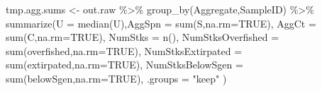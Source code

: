 \documentclass[french,11pt]{book}
\newenvironment{Shaded}{\begin{snugshade}}{\end{snugshade}}
\newcommand{\AttributeTok}[1]{\textcolor[rgb]{0.77,0.63,0.00}{#1}}
\newcommand{\ConstantTok}[1]{\textcolor[rgb]{0.00,0.00,0.00}{#1}}
\newcommand{\FunctionTok}[1]{\textcolor[rgb]{0.00,0.00,0.00}{#1}}
\newcommand{\NormalTok}[1]{#1}
\newcommand{\OtherTok}[1]{\textcolor[rgb]{0.56,0.35,0.01}{#1}}
\newcommand{\SpecialCharTok}[1]{\textcolor[rgb]{0.00,0.00,0.00}{#1}}
\newcommand{\StringTok}[1]{\textcolor[rgb]{0.31,0.60,0.02}{#1}}
\begin{document}
\begin{Shaded}
\begin{Highlighting}[]
\NormalTok{  tmp.agg.sums }\OtherTok{\textless{}{-}}\NormalTok{ out.raw }\SpecialCharTok{\%\textgreater{}\%} \FunctionTok{group\_by}\NormalTok{(Aggregate,SampleID) }\SpecialCharTok{\%\textgreater{}\%}
    \FunctionTok{summarize}\NormalTok{(}\AttributeTok{U =} \FunctionTok{median}\NormalTok{(U),}\AttributeTok{AggSpn =} \FunctionTok{sum}\NormalTok{(S,}\AttributeTok{na.rm=}\ConstantTok{TRUE}\NormalTok{), }
              \AttributeTok{AggCt =} \FunctionTok{sum}\NormalTok{(C,}\AttributeTok{na.rm=}\ConstantTok{TRUE}\NormalTok{),}
              \AttributeTok{NumStks =} \FunctionTok{n}\NormalTok{(),}
              \AttributeTok{NumStksOverfished =} \FunctionTok{sum}\NormalTok{(overfished,}\AttributeTok{na.rm=}\ConstantTok{TRUE}\NormalTok{),}
              \AttributeTok{NumStksExtirpated =} \FunctionTok{sum}\NormalTok{(extirpated,}\AttributeTok{na.rm=}\ConstantTok{TRUE}\NormalTok{),}
              \AttributeTok{NumStksBelowSgen =} \FunctionTok{sum}\NormalTok{(belowSgen,}\AttributeTok{na.rm=}\ConstantTok{TRUE}\NormalTok{),}
              \AttributeTok{.groups =} \StringTok{"keep"}
\NormalTok{    )}


\end{Highlighting}
\end{Shaded}
\end{document}
